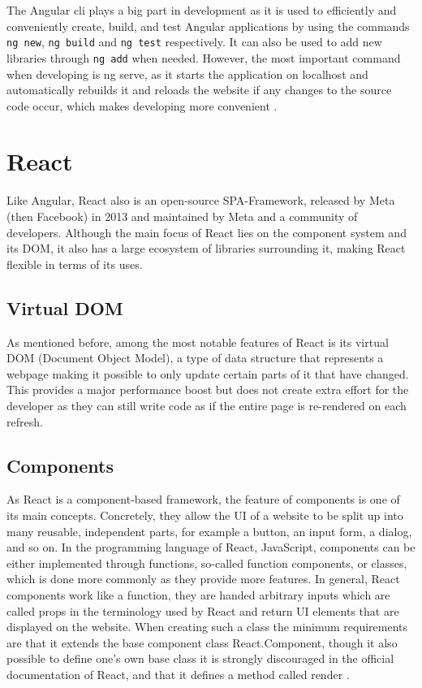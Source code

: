 The Angular \gls{cli} plays a big part in development as it is used to efficiently and 
conveniently create, build, and test Angular applications by using the commands \texttt{ng new}, \texttt{ng build}
and \texttt{ng test} respectively. It can also be used to add new libraries through \texttt{ng add}
when needed. However, the most important command when developing is ng serve, as it starts the application on
localhost and automatically rebuilds it and reloads the website if any changes to the source code occur, which makes 
developing more convenient \cite{AngularCLI}.

\section{React}
Like Angular, React also is an open-source SPA-Framework, released by Meta (then Facebook) in 2013 and maintained by
Meta and a community of developers. Although the main focus of React lies on the component system and its DOM, it also 
has a large ecosystem of libraries surrounding it, making React flexible in terms of its uses.

\subsection{Virtual DOM}
As mentioned before, among the most notable features of React is its virtual DOM (Document Object Model), a type of 
data structure that represents a webpage making it possible to only update certain parts of it that have changed. 
This provides a major performance boost but does not create extra effort for the developer as they can still write 
code as if the entire page is re-rendered on each refresh.

\subsection{Components}
As React is a component-based framework, the feature of components is one of its main concepts. Concretely, they
allow the UI of a website to be split up into many reusable, independent parts,
for example a button, an input form, a dialog, and so on. In the programming language of React, JavaScript,
components can be either implemented through functions, so-called function components, or classes, which is done 
more commonly as they provide more features. In general, React components work like a function, they are handed 
arbitrary inputs which are called props in the terminology used by React
and return UI elements that are displayed on the website. When creating 
such a class the minimum requirements are that it extends the base component class React.Component, though it 
also possible to define one's own base class it is strongly discouraged in the official documentation of React,
and that it defines a method called render \cite{ReactComponentProps} \cite{ReactComponent}.

